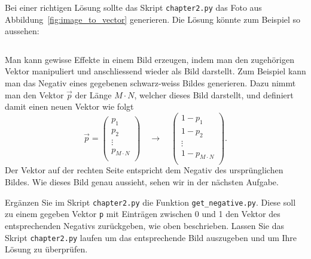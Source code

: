 \begin{losung}
	Bei einer richtigen Lösung sollte das Skript \texttt{chapter2.py} das Foto aus Abbildung~\ref{fig:image_to_vector} generieren.
	Die Lösung könnte zum Beispiel so aussehen:
\inputminted[frame=single,framesep=5pt,firstline=4,lastline=9]{python}{codes/solution/chapter2.py}
\end{losung}
Man kann gewisse Effekte in einem Bild erzeugen, indem man den zugehörigen Vektor manipuliert und anschliessend wieder als Bild darstellt.
Zum Beispiel kann man das Negativ eines gegebenen schwarz-weiss Bildes generieren.
Dazu nimmt man den Vektor $\vec p$ der Länge $M\cdot N$, welcher dieses Bild darstellt, und definiert damit einen neuen Vektor wie folgt
\begin{equation*}
	\vec p=
	\begin{pmatrix}
		p_1 \\ p_2 \\ \vdots \\ p_{M\cdot N} \\
	\end{pmatrix}
	\quad\longrightarrow\quad
	\begin{pmatrix}
		1-p_1 \\ 1-p_2 \\ \vdots \\ 1-p_{M\cdot N} \\
	\end{pmatrix}.
\end{equation*}
Der Vektor auf der rechten Seite entspricht dem Negativ des ursprünglichen Bildes.
Wie dieses Bild genau aussieht, sehen wir in der nächsten Aufgabe.
\begin{aufgabe} \label{aufg:negative}
	Ergänzen Sie im Skript \texttt{chapter2.py} die Funktion \texttt{get\_negative.py}.
	Diese soll zu einem gegeben Vektor \texttt{p} mit Einträgen zwischen 0 und 1 den Vektor des entsprechenden Negativs zurückgeben, wie oben beschrieben.
	Lassen Sie das Skript \texttt{chapter2.py} laufen um das entsprechende Bild auszugeben und um Ihre Lösung zu überprüfen.
\end{aufgabe}
